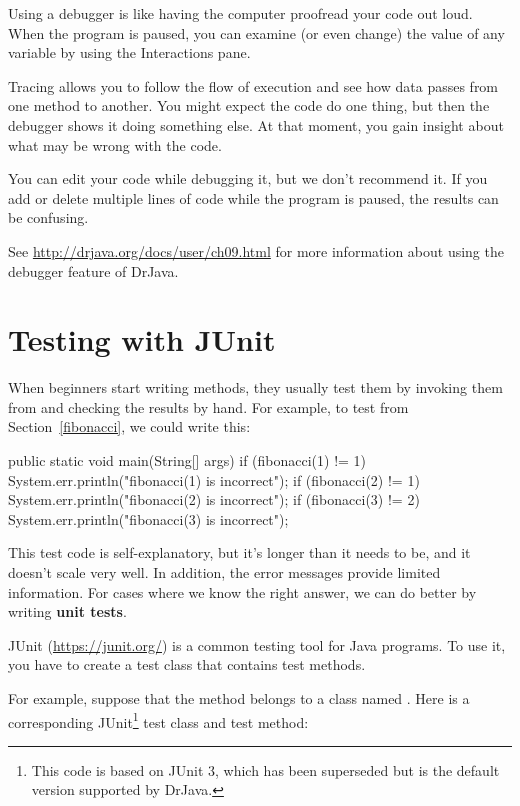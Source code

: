 Using a debugger is like having the computer proofread your code out loud.
When the program is paused, you can examine (or even change) the value of any variable by using the Interactions pane.

Tracing allows you to follow the flow of execution and see how data passes from one method to another.
You might expect the code do one thing, but then the debugger shows it doing something else.
At that moment, you gain insight about what may be wrong with the code.

You can edit your code while debugging it, but we don't recommend it.
If you add or delete multiple lines of code while the program is paused, the results can be confusing.

See \url{http://drjava.org/docs/user/ch09.html} for more information about using the debugger feature of DrJava.


\section{Testing with JUnit}
\label{JUnit}


When beginners start writing methods, they usually test them by invoking them from  and checking the results by hand.
For example, to test  from Section~\ref{fibonacci}, we could write this:

\begin{code}
public static void main(String[] args) {
    if (fibonacci(1) != 1) {
        System.err.println("fibonacci(1) is incorrect");
    }
    if (fibonacci(2) != 1) {
        System.err.println("fibonacci(2) is incorrect");
    }
    if (fibonacci(3) != 2) {
        System.err.println("fibonacci(3) is incorrect");
    }
}
\end{code}

This test code is self-explanatory, but it's longer than it needs to be, and it doesn't scale very well.
In addition, the error messages provide limited information.
For cases where we know the right answer, we can do better by writing {\bf unit tests}.


JUnit (\url{https://junit.org/}) is a common testing tool for Java programs.
To use it, you have to create a test class that contains test methods.

For example, suppose that the  method belongs to a class named .
Here is a corresponding JUnit\footnote{This code is based on JUnit 3, which has been superseded but is the default version supported by DrJava.} test class and test method:

